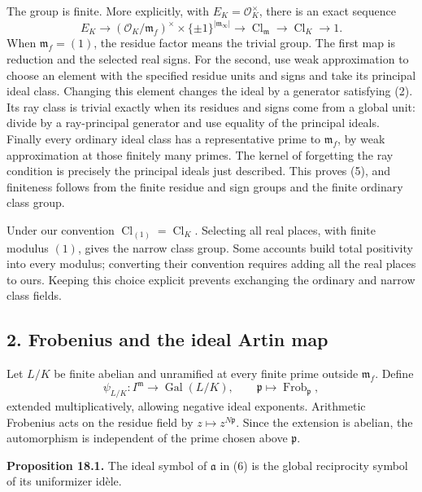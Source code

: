 \documentclass[11pt,a4paper]{article}
\begin{document}
The group is finite. More explicitly, with \(E_K=\mathcal O_K^\times\),
there is an exact sequence \[
E_K\longrightarrow
(\mathcal O_K/\mathfrak m_f)^\times\times\{\pm1\}^{|\mathfrak m_\infty|}
\longrightarrow\operatorname{Cl}_{\mathfrak m}
\longrightarrow\operatorname{Cl}_K\longrightarrow1.
\tag{5}
\] When \(\mathfrak m_f=(1)\), the residue factor means the trivial
group. The first map is reduction and the selected real signs. For the
second, use weak approximation to choose an element with the specified
residue units and signs and take its principal ideal class. Changing
this element changes the ideal by a generator satisfying (2). Its ray
class is trivial exactly when its residues and signs come from a global
unit: divide by a ray-principal generator and use equality of the
principal ideals. Finally every ordinary ideal class has a
representative prime to \(\mathfrak m_f\), by weak approximation at
those finitely many primes. The kernel of forgetting the ray condition
is precisely the principal ideals just described. This proves (5), and
finiteness follows from the finite residue and sign groups and the
finite ordinary class group.

Under our convention \(\operatorname{Cl}_{(1)}=\operatorname{Cl}_K\).
Selecting all real places, with finite modulus \((1)\), gives the narrow
class group. Some accounts build total positivity into every modulus;
converting their convention requires adding all the real places to ours.
Keeping this choice explicit prevents exchanging the ordinary and narrow
class fields.

\subsection{2. Frobenius and the ideal Artin
map}\label{frobenius-and-the-ideal-artin-map}

Let \(L/K\) be finite abelian and unramified at every finite prime
outside \(\mathfrak m_f\). Define \[
\psi_{L/K}:I^{\mathfrak m}\longrightarrow\operatorname{Gal}(L/K),
\qquad
\mathfrak p\longmapsto\operatorname{Frob}_{\mathfrak p},
\tag{6}
\] extended multiplicatively, allowing negative ideal exponents.
Arithmetic Frobenius acts on the residue field by
\(z\mapsto z^{N\mathfrak p}\). Since the extension is abelian, the
automorphism is independent of the prime chosen above \(\mathfrak p\).

\textbf{Proposition 18.1.} The ideal symbol of \(\mathfrak a\) in (6) is
the global reciprocity symbol of its uniformizer idèle.
\end{document}
